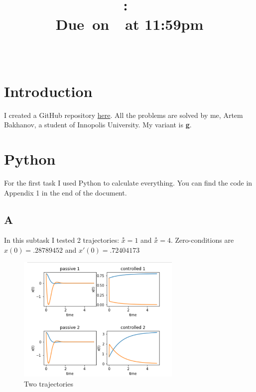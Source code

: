 \documentclass{article}
\title{
    \vspace{2in}
    \textmd{\textbf{\hmwkClass:\ \hmwkTitle}}\\
    \normalsize\vspace{0.1in}\small{Due\ on\ \hmwkDueDate\ at 11:59pm}\\
    \vspace{0.1in}\large{\textit{\hmwkClassInstructor\ }}
    \vspace{3in}
}
\author{\hmwkAuthorName}
\date{}
\begin{document}
\maketitle

\pagebreak

\tableofcontents

\pagebreak

\section{Introduction}
    I created a GitHub repository \href{https://github.com/artembakhanov/ControlTheoryHomework}{here}.
    All the problems are solved by me, Artem Bakhanov, a student of Innopolis University. My variant is \textbf{g}.
\section{Python}
For the first task I used Python to calculate everything. You can find the code in Appendix 1 in the end of the document.
\subsection{A}
In this subtask I tested 2 trajectories: $\overset{*}{x} = 1$ and $\overset{*}{x} = 4$. Zero-conditions are $x(0) = .28789452$ and $x'(0) = .72404173$
\begin{figure}[ht]
        \centering
        \includegraphics[width=0.7\textwidth]{images/1}
        \caption{Two trajectories}
        \label{fig:plot1a}
\end{figure}
\end{document}
